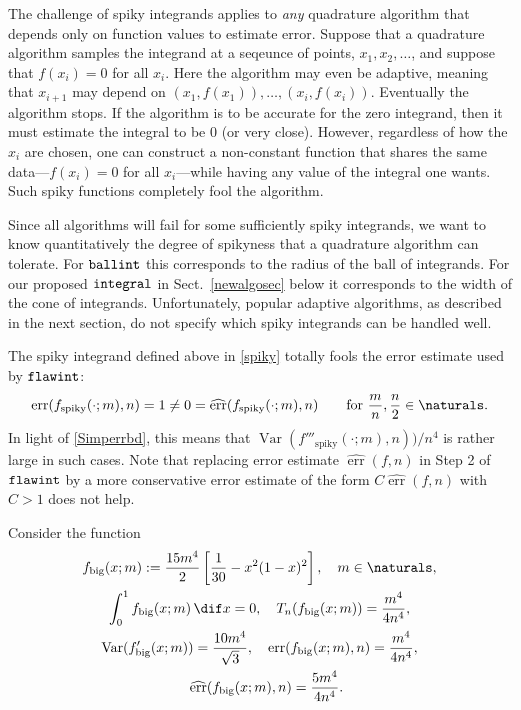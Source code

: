\documentclass[]{article}
\DeclareMathOperator{\integ}{\texttt{\textup{integral}}}
\DeclareMathOperator{\flawinteg}{\texttt{\textup{flawint}}}
\DeclareMathOperator{\ballinteg}{\texttt{\textup{ballint}}}
\DeclareMathOperator{\Var}{Var}
\DeclareMathOperator{\err}{err}
\newcommand{\herr}{\widehat{\err}}
\theoremstyle{definition}
\theoremstyle{remark}
\begin{document}
The challenge of spiky integrands applies to \emph{any} quadrature algorithm that depends only on function values to estimate error.  Suppose that a quadrature algorithm samples the integrand at a seqeunce of points, $x_1, x_2, \ldots$, and suppose that $f(x_i)=0$ for all $x_i$.  Here the algorithm may even be adaptive, meaning that $x_{i+1}$ may depend on $(x_1, f(x_1)), \ldots, (x_i, f(x_i))$.  Eventually the algorithm stops.  If the algorithm is to be accurate for the zero integrand, then it must estimate the integral to be $0$ (or very close).  However, regardless of how the $x_i$ are chosen, one can construct a non-constant function that shares the same data---$f(x_i)=0$ for all $x_i$---while having any value of the integral one wants. Such spiky functions completely fool the algorithm.

Since all algorithms will fail for some sufficiently spiky integrands, we want to know quantitatively the degree of spikyness that a quadrature algorithm can tolerate.  For $\ballinteg$ this corresponds to the radius of the ball of integrands.  For our proposed $\integ$ in Sect.\ \ref{newalgosec} below it corresponds to the width of the cone of integrands.  Unfortunately, popular adaptive algorithms, as described in the next section, do not specify which spiky integrands can be handled well.









The spiky integrand defined above in \eqref{spiky} totally fools the error estimate used by $\flawinteg$:
\[
\err(f_{\text{spiky}}(\cdot;m),n) = 1 \ne 0 = \herr(f_{\text{spiky}}(\cdot;m),n) \qquad \text{for } \frac{m}{n}, \frac{n}{2} \in \naturals.
\]
In light of \eqref{Simperrbd}, this means that $\Var(f'''_{\text{spiky}}(\cdot;m),n))/n^4$ is rather large in such cases.  Note that replacing error estimate $\herr(f,n)$ in Step 2 of $\flawinteg$ by a more conservative error estimate of the form $C\herr(f,n)$ with $C>1$ does not help.


Consider the function
\begin{subequations} \label{fbig}
\begin{gather} 
f_{\text{big}}(x;m) :=  \frac{15 m^4}{2} \left[ \frac{1}{30} - x^2(1-x)^2 \right], \quad m \in \naturals, \\
\int_0^1 f_{\text{big}}(x;m) \, \dif x =  0, \quad T_{n}(f_{\text{big}}(x;m))= \frac{m^4}{4n^4},  \\
\Var(f'_{\text{big}}(x;m)) = \frac{10 m^4}{\sqrt{3}}, \quad  \err(f_{\text{big}}(x;m),n)=\frac{m^4}{4n^4}, \\ \quad \herr(f_{\text{big}}(x;m),n)=\frac{5m^4}{4n^4} .
\end{gather}
\end{subequations}
\end{document}
